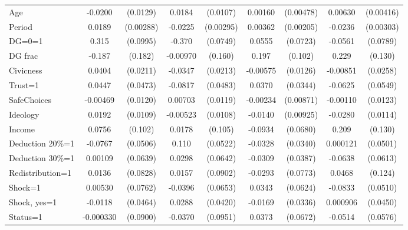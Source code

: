 \begin{tabular}{l|cccccc|cc}
Age             &  -0.0200         & (0.0129)&   0.0184\sym{*}  & (0.0107)&  0.00160         &(0.00478)&  0.00630         &(0.00416)\\
Period          &   0.0189\sym{***}&(0.00288)&  -0.0225\sym{***}&(0.00295)&  0.00362\sym{*}  &(0.00205)&  -0.0236\sym{***}&(0.00303)\\
DG=0=1          &    0.315\sym{***}& (0.0995)&   -0.370\sym{***}& (0.0749)&   0.0555         & (0.0723)&  -0.0561         & (0.0789)\\
DG frac         &   -0.187         &  (0.182)& -0.00970         &  (0.160)&    0.197\sym{*}  &  (0.102)&    0.229\sym{*}  &  (0.130)\\
Civicness       &   0.0404\sym{*}  & (0.0211)&  -0.0347         & (0.0213)& -0.00575         & (0.0126)& -0.00851         & (0.0258)\\
Trust=1         &   0.0447         & (0.0473)&  -0.0817\sym{*}  & (0.0483)&   0.0370         & (0.0344)&  -0.0625         & (0.0549)\\
SafeChoices     & -0.00469         & (0.0120)&  0.00703         & (0.0119)& -0.00234         &(0.00871)& -0.00110         & (0.0123)\\
Ideology        &   0.0192\sym{*}  & (0.0109)& -0.00523         & (0.0108)&  -0.0140         &(0.00925)&  -0.0280\sym{**} & (0.0114)\\
Income          &   0.0756         &  (0.102)&   0.0178         &  (0.105)&  -0.0934         & (0.0680)&    0.209         &  (0.130)\\
Deduction 20\%=1&  -0.0767         & (0.0506)&    0.110\sym{**} & (0.0522)&  -0.0328         & (0.0340)& 0.000121         & (0.0501)\\
Deduction 30\%=1&  0.00109         & (0.0639)&   0.0298         & (0.0642)&  -0.0309         & (0.0387)&  -0.0638         & (0.0613)\\
Redistribution=1&   0.0136         & (0.0828)&   0.0157         & (0.0902)&  -0.0293         & (0.0773)&   0.0468         &  (0.124)\\
Shock=1         &  0.00530         & (0.0762)&  -0.0396         & (0.0653)&   0.0343         & (0.0624)&  -0.0833         & (0.0510)\\
Shock, yes=1    &  -0.0118         & (0.0464)&   0.0288         & (0.0420)&  -0.0169         & (0.0336)& 0.000906         & (0.0450)\\
Status=1        &-0.000330         & (0.0900)&  -0.0370         & (0.0951)&   0.0373         & (0.0672)&  -0.0514         & (0.0576)\\

\end{tabular}
